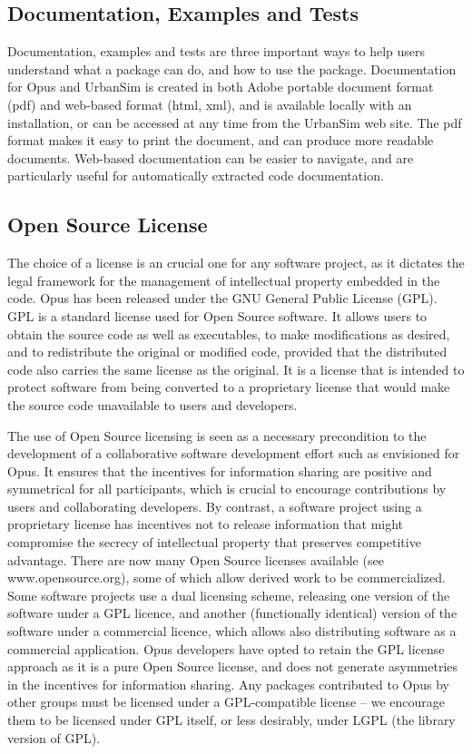 \subsection{Documentation, Examples and Tests}
Documentation, examples and tests are three important ways to help users understand what a package can do, and how to use the package.  Documentation for Opus and UrbanSim is created in both Adobe portable document format (pdf) and web-based format (html, xml), and is available locally with an installation, or can be accessed at any time from the UrbanSim web site.  The pdf format makes it easy to print the document, and can produce more readable documents.  Web-based documentation can be easier to navigate, and are particularly useful for automatically extracted code documentation.

\subsection{Open Source License}
The choice of a license is an crucial one for any software project, as it dictates the legal framework for the management of intellectual property embedded in the code.  Opus has been released under the GNU General Public License (GPL).  GPL is a standard license used for Open Source software.  It allows users to obtain the source code as well as executables, to make modifications as desired, and to redistribute the original or modified code, provided that the distributed code also carries the same license as the original.  It is a license that is intended to protect software from being converted to a proprietary license that would make the source code unavailable to users and developers.

The use of Open Source licensing is seen as a necessary precondition to the development of a collaborative software development effort such as envisioned for Opus.  It ensures that the incentives for information sharing are positive and symmetrical for all participants, which is crucial to encourage contributions by users and collaborating developers.  By contrast, a software project using a proprietary license has incentives not to release information that might compromise the secrecy of intellectual property that preserves competitive advantage. 
There are now many Open Source licenses available (see www.opensource.org), some of which allow derived work to be commercialized.  Some software projects use a dual licensing scheme, releasing one version of the software under a GPL licence, and another (functionally identical) version of the software under a commercial licence, which allows also distributing software as a commercial application.  Opus developers have opted to retain the GPL license approach as it is a pure Open Source license, and does not generate asymmetries in the incentives for information sharing. Any packages contributed to Opus by other groups must be licensed under a GPL-compatible license – we encourage them to be licensed under GPL itself, or less desirably, under LGPL (the library version of GPL).

